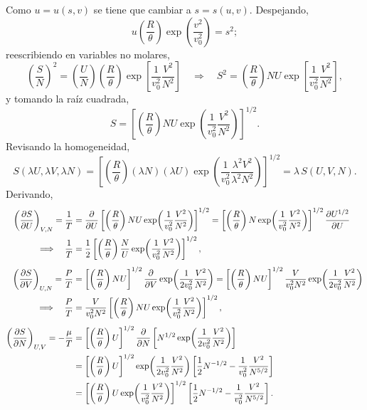 \begin{solucion}
  Como $u=u(s,v)$ se tiene que cambiar a $s=s(u,v)$. Despejando,
  \begin{equation*}
    u\left(\frac{R}{\theta}\right)\exp\!\left(\frac{v^{2}}{v_0^{2}}\right)=s^{2};
  \end{equation*}
  reescribiendo en variables no molares,
  \begin{equation*}
    \left(\frac{S}{N}\right)^{2}=\left(\frac{U}{N}\right)\left(\frac{R}{\theta}\right)\exp\!\left[\frac{1}{v_0^{2}}\frac{V^{2}}{N^{2}}\right]
    \quad\Longrightarrow\quad
    S^{2}=\left(\frac{R}{\theta}\right)NU\exp\!\left[\frac{1}{v_0^{2}}\frac{V^{2}}{N^{2}}\right],
  \end{equation*}
  y tomando la raíz cuadrada,
  \begin{equation*}
    S=\left[\left(\frac{R}{\theta}\right)NU\exp\!\left(\frac{1}{v_0^{2}}\frac{V^{2}}{N^{2}}\right)\right]^{1/2}.
  \end{equation*}
  Revisando la homogeneidad,
  \begin{equation*}
    S(\lambda U,\lambda V,\lambda N)=\left[\left(\frac{R}{\theta}\right)(\lambda N)(\lambda U)\exp\!\left(\frac{1}{v_0^{2}}\frac{\lambda^{2}V^{2}}{\lambda^{2}N^{2}}\right)\right]^{1/2}
    =\lambda\,S(U,V,N).
  \end{equation*}
  Derivando,
  \begin{align*}
    \pdvc{S}{U}{V,N}=\frac{1}{T}&=\pdv{U}\left[\left(\frac{R}{\theta}\right)NU\exp\!\left(\frac{1}{v_0^{2}}\frac{V^{2}}{N^{2}}\right)\right]^{1/2}
      =\left[\left(\frac{R}{\theta}\right)N\exp\!\left(\frac{1}{v_0^{2}}\frac{V^{2}}{N^{2}}\right)\right]^{1/2}\pdv{U^{1/2}}{U}\\
    \Longrightarrow\quad\frac{1}{T}&=\frac{1}{2}\left[\left(\frac{R}{\theta}\right)\frac{N}{U}\exp\!\left(\frac{1}{v_0^{2}}\frac{V^{2}}{N^{2}}\right)\right]^{1/2},\\[4pt]
    \pdvc{S}{V}{U,N}=\frac{P}{T}&=\left[\left(\frac{R}{\theta}\right)NU\right]^{1/2}\pdv{V}\exp\!\left(\frac{1}{2v_0^{2}}\frac{V^{2}}{N^{2}}\right)
      =\left[\left(\frac{R}{\theta}\right)NU\right]^{1/2}\frac{V}{v_0^{2}N^{2}}\exp\!\left(\frac{1}{2v_0^{2}}\frac{V^{2}}{N^{2}}\right)\\
    \Longrightarrow\quad\frac{P}{T}&=\frac{V}{v_0^{2}N^{2}}\left[\left(\frac{R}{\theta}\right)NU\exp\!\left(\frac{1}{v_0^{2}}\frac{V^{2}}{N^{2}}\right)\right]^{1/2},\\[4pt]
    \pdvc{S}{N}{U,V}=-\frac{\mu}{T}&=\left[\left(\frac{R}{\theta}\right)U\right]^{1/2}\pdv{N}\left[N^{1/2}\exp\!\left(\frac{1}{2v_0^{2}}\frac{V^{2}}{N^{2}}\right)\right]\\
      &=\left[\left(\frac{R}{\theta}\right)U\right]^{1/2}\exp\!\left(\frac{1}{2v_0^{2}}\frac{V^{2}}{N^{2}}\right)\left[\frac{1}{2}N^{-1/2}-\frac{1}{v_0^{2}}\frac{V^{2}}{N^{5/2}}\right]\\
      &=\left[\left(\frac{R}{\theta}\right)U\exp\!\left(\frac{1}{v_0^{2}}\frac{V^{2}}{N^{2}}\right)\right]^{1/2}\left[\frac{1}{2}N^{-1/2}-\frac{1}{v_0^{2}}\frac{V^{2}}{N^{5/2}}\right].
  \end{align*}
\end{solucion}

